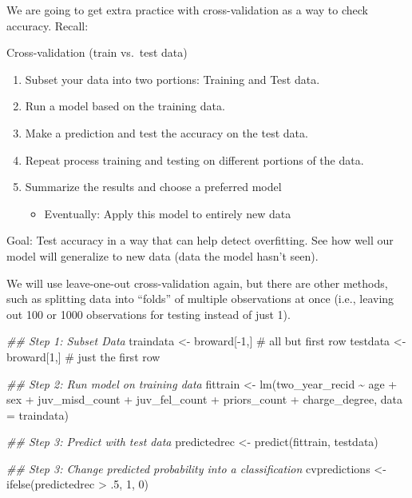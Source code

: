 \documentclass[
  letterpaper,
  DIV=11,
  numbers=noendperiod]{scrreprt}
\newenvironment{Shaded}{\begin{snugshade}}{\end{snugshade}}
\newcommand{\AttributeTok}[1]{\textcolor[rgb]{0.40,0.45,0.13}{#1}}
\newcommand{\CommentTok}[1]{\textcolor[rgb]{0.37,0.37,0.37}{#1}}
\newcommand{\DecValTok}[1]{\textcolor[rgb]{0.68,0.00,0.00}{#1}}
\newcommand{\DocumentationTok}[1]{\textcolor[rgb]{0.37,0.37,0.37}{\textit{#1}}}
\newcommand{\FunctionTok}[1]{\textcolor[rgb]{0.28,0.35,0.67}{#1}}
\newcommand{\NormalTok}[1]{\textcolor[rgb]{0.00,0.23,0.31}{#1}}
\newcommand{\OtherTok}[1]{\textcolor[rgb]{0.00,0.23,0.31}{#1}}
\newcommand{\SpecialCharTok}[1]{\textcolor[rgb]{0.37,0.37,0.37}{#1}}
\providecommand{\tightlist}{%
  \setlength{\itemsep}{0pt}\setlength{\parskip}{0pt}}\usepackage{longtable,booktabs,array}
\begin{document}
We are going to get extra practice with cross-validation as a way to
check accuracy. Recall:

Cross-validation (train vs.~test data)

\begin{enumerate}
\def\labelenumi{\arabic{enumi}.}
\tightlist
\item
  Subset your data into two portions: Training and Test data.
\item
  Run a model based on the training data.
\item
  Make a prediction and test the accuracy on the test data.
\item
  Repeat process training and testing on different portions of the data.
\item
  Summarize the results and choose a preferred model

  \begin{itemize}
  \tightlist
  \item
    Eventually: Apply this model to entirely new data
  \end{itemize}
\end{enumerate}

Goal: Test accuracy in a way that can help detect overfitting. See how
well our model will generalize to new data (data the model hasn't seen).

We will use leave-one-out cross-validation again, but there are other
methods, such as splitting data into ``folds'' of multiple observations
at once (i.e., leaving out 100 or 1000 observations for testing instead
of just 1).

\begin{Shaded}
\begin{Highlighting}[]
\DocumentationTok{\#\# Step 1: Subset Data}
\NormalTok{traindata }\OtherTok{\textless{}{-}}\NormalTok{ broward[}\SpecialCharTok{{-}}\DecValTok{1}\NormalTok{,] }\CommentTok{\# all but first row}
\NormalTok{testdata }\OtherTok{\textless{}{-}}\NormalTok{ broward[}\DecValTok{1}\NormalTok{,] }\CommentTok{\# just the first row}

\DocumentationTok{\#\# Step 2: Run model on training data}
\NormalTok{fittrain }\OtherTok{\textless{}{-}} \FunctionTok{lm}\NormalTok{(two\_year\_recid }\SpecialCharTok{\textasciitilde{}}\NormalTok{ age }\SpecialCharTok{+}\NormalTok{ sex }\SpecialCharTok{+}\NormalTok{ juv\_misd\_count }
               \SpecialCharTok{+}\NormalTok{ juv\_fel\_count }\SpecialCharTok{+} 
\NormalTok{            priors\_count }\SpecialCharTok{+}\NormalTok{ charge\_degree, }
          \AttributeTok{data =}\NormalTok{ traindata)}

\DocumentationTok{\#\# Step 3: Predict with test data}
\NormalTok{predictedrec }\OtherTok{\textless{}{-}} \FunctionTok{predict}\NormalTok{(fittrain, testdata)}

\DocumentationTok{\#\# Step 3: Change predicted probability into a classification}
\NormalTok{cvpredictions }\OtherTok{\textless{}{-}} \FunctionTok{ifelse}\NormalTok{(predictedrec }\SpecialCharTok{\textgreater{}}\NormalTok{ .}\DecValTok{5}\NormalTok{, }\DecValTok{1}\NormalTok{, }\DecValTok{0}\NormalTok{)}
\end{Highlighting}
\end{Shaded}
\end{document}
